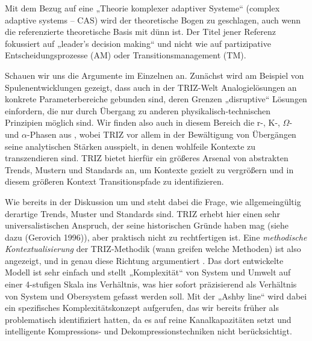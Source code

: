 \documentclass[11pt,a4paper]{article}
\begin{document}
Mit dem Bezug auf eine „Theorie komplexer adaptiver Systeme“ (complex adaptive
systems -- CAS) wird der theoretische Bogen zu \cite{Foxon2009} geschlagen,
auch wenn die referenzierte theoretische Basis mit \cite{Snowden2007} dünn
ist. Der Titel jener Referenz fokussiert auf „leader's decision making“ und
nicht wie \cite{Foxon2009} auf partizipative Entscheidungsprozesse (AM) oder
Transitionsmanagement (TM).

Schauen wir uns die Argumente im Einzelnen an. Zunächst wird am Beispiel von
Spulenentwicklungen gezeigt, dass auch in der TRIZ-Welt Analogielösungen an
konkrete Parameterbereiche gebunden sind, deren Grenzen „disruptive“ Lösungen
einfordern, die nur durch Übergang zu anderen physikalisch-technischen
Prinzipien möglich sind. Wir finden also auch in diesem Bereich die r-, K-,
$\Omega$- und $\alpha$-Phasen aus \cite{Holling2000}, wobei TRIZ vor allem in
der Bewältigung von Übergängen seine analytischen Stärken ausspielt, in denen
wohlfeile Kontexte zu trans\-zendieren sind. TRIZ bietet hierfür ein größeres
Arsenal von abstrakten Trends, Mustern und Standards an, um Kontexte gezielt
zu vergrößern und in diesem größeren Kontext Transitionspfade zu
identifizieren.

Wie bereits in der Diskussion um \cite{Geels2007} und \cite{Foxon2009} steht
dabei die Frage, wie allgemeingültig derartige Trends, Muster und Standards
sind. TRIZ erhebt hier einen sehr universalistischen Anspruch, der seine
historischen Gründe haben mag (siehe dazu (Gerovich 1996)), aber praktisch
nicht zu rechtfertigen ist. Eine \emph{methodische Kontextualisierung} der
TRIZ-Methodik (wann greifen welche Methoden) ist also angezeigt, und in genau
diese Richtung argumentiert \cite{Mann2019}.  Das dort entwickelte Modell ist
sehr einfach und stellt „Komplexität“ von System und Umwelt auf einer
4-stufigen Skala ins Verhältnis, was hier sofort präzisierend als Verhältnis
von System und Obersystem gefasst werden soll. Mit der „Ashby line“ wird dabei
ein spezifisches Komplexitätskonzept aufgerufen, das wir bereits früher als
problematisch identifiziert hatten, da es auf reine Kanalkapazitäten setzt und
intelligente Kompressions- und Dekompressionstechniken nicht berücksichtigt.
\end{document}
